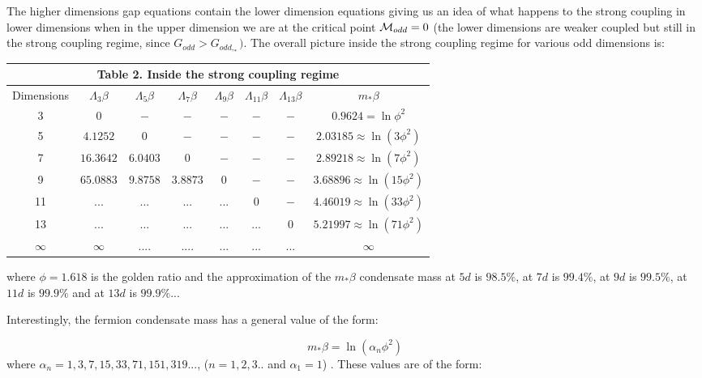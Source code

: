 \documentclass[twoside]{article}
\begin{document}
The higher dimensions gap equations contain the lower dimension equations giving us an idea of what happens to the strong coupling in lower dimensions when in the upper dimension we are at the critical point ${\cal M}_{odd}=0$ (the lower dimensions are weaker coupled but still in  the strong coupling regime, since $G_{odd}>G_{odd,_*})$. The overall picture inside the strong coupling regime for various odd dimensions is:

{\centering
	\begin{tabular}{|c|c|c|c|c|c|c|c|}
		\hline 
		\multicolumn{8}{|c|}{\textbf{Table 2. Inside the strong coupling regime}} \\ 
		\hline 
		Dimensions & $\Lambda_3\beta$ & $\Lambda_5\beta$ & $\Lambda_7\beta$ & $\Lambda_9\beta$ & $\Lambda_{11}\beta$ & $\Lambda_{13}\beta$ & $m_*\beta$ \\ 
		\hline 
		3 & $0$ & $-$ & $-$ & $-$ & $-$ & $-$ & $0.9624=\ln\phi^2$ \\ 
		\hline 
		5 & $4.1252$ & $0$ & $-$ & $-$ & $-$ & $-$ & $2.03185\approx\ln(3\phi^2)$ \\ 
		\hline 
		7 & $16.3642$ & $6.0403$ & $0$ & $-$ & $-$ & $-$ & $2.89218\approx\ln(7\phi^2)$ \\ 
		\hline
		9 & $65.0883$ & $9.8758$ & $3.8873$ & $0$ & $-$ & $-$ & $3.68896\approx\ln(15\phi^2)$ \\ 
		\hline 
		11 & $...$ & $...$ & $...$ & $...$ & $0$ & $-$ & $4.46019\approx\ln(33\phi^2)$\\
		\hline
		13 & $...$ & $...$ & $...$ & $...$ & $...$ & $0$ & $5.21997\approx\ln(71\phi^2)$\\
		\hline
		$\infty$ & $\infty$ &  $....$ & $....$ & $...$ & $...$ & $...$ & $\infty$ \\
		\hline 
	\end{tabular}\par}
	
where $\phi=1.618$ is the golden ratio and the approximation of the $m_*\beta$ condensate mass at $5d$ is $98.5\%$, at $7d$ is $99.4\%$, at $9d$ is $99.5\%$, at $11d$ is $99.9\%$ and at $13d$ is $99.9\%$...

Interestingly, the fermion condensate mass has a general value of the form:

\begin{equation}
\label{mass}
\boxed
{m_*\beta=\ln(\alpha_n\phi^2)}
\end{equation}
where $\alpha_n=1,3,7,15,33,71,151,319...$, ($n=1,2,3..$ and $\alpha_1=1$) \cite{OEIS1}. These values are of the form:
\end{document}
